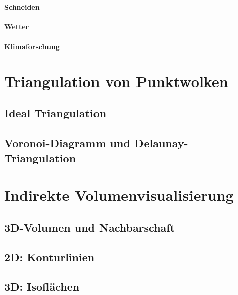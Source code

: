 \documentclass[a4paper, 11pt, accentcolor = tud3b]{tudreport}
\begin{document}
			\paragraph{Schneiden} %

			\paragraph{Wetter} %

			\paragraph{Klimaforschung} %

		\section{Triangulation von Punktwolken} %

			\subsection{Ideal Triangulation} %

			\subsection{Voronoi-Diagramm und Delaunay-Triangulation} %

		\section{Indirekte Volumenvisualisierung} %

			\subsection{3D-Volumen und Nachbarschaft} %

			\subsection{2D: Konturlinien} %

			\subsection{3D: Isoflächen} %
\end{document}
